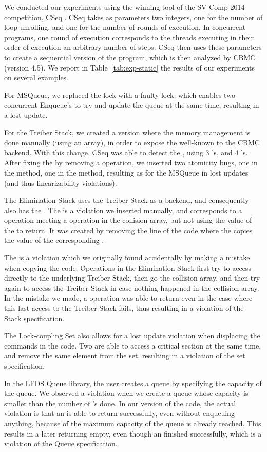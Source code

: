 We conducted our experiments using the winning tool of the SV-Comp 2014 
competition, CSeq \citep{cseq}. CSeq takes as parameters two integers, 
one for the number of loop unrolling, and one for the number of rounds of 
execution. In concurrent programs, one round of execution corresponds to the
threads executing in their order of execution an arbitrary number of steps.
CSeq then uses these parameters to create a sequential version of the program,
which is then analyzed by CBMC (version 4.5). We report in 
Table~\ref{tab:exp-static} the results of our experiments on several examples.

For MSQueue, we replaced the lock with a faulty lock, which enables two 
concurrent Enqueue's to try and update the queue at the same time, resulting
in a lost update.

For the Treiber Stack, we created a version where the memory management is done
manually (using an array), in order to expose the well-known \ababug{} to the 
CBMC backend. With this change, CSeq was able to detect the \ababug{}, using 3 
\Pushm's, and 4 \Popm's. After fixing the \ababug{} by removing a \free{} 
operation, we inserted two atomicity bugs, one in the \Pushm{} method, one in 
the \Popm{} method, resulting as for the MSQueue in lost updates (and thus 
linearizability violations).

The Elimination Stack \citep{elimination stack} uses the Treiber Stack as a 
backend, and consequently also has the \ababug{}. The \emptybug{} is a 
violation we inserted manually, and corresponds to a \Popm{} operation meeting 
a \Pushm{} operation in the collision array, but not using the value of the 
\Pushm{} to return. It was created by removing the line of the code where the 
\Popm{} copies the value of the corresponding \Pushm{}. 

The \bracebug{} is a violation which we originally found accidentally by making 
a mistake when copying the code. Operations in the Elimination Stack first try 
to access directly to the underlying Treiber Stack, then go the collision array, 
and then try again to access the Treiber Stack in case nothing happened in the 
collision array. In the mistake we made, a \Popm{} operation was able to return 
even in the case where this last access to the Treiber Stack fails, thus 
resulting in a violation of the Stack specification.

The Lock-coupling Set also allows for a lost update violation when displacing
the \unlock{} commands in the code. Two \Removem{} are able to access a 
critical section at the same time, and remove the same element from the set,
resulting in a violation of the set specification.
 
In the LFDS Queue library, the user creates a queue by specifying the capacity
of the queue. We observed a violation when we create a queue whose capacity
is smaller than the number of \Enqueuem{}'s done. In our version of the code, 
the actual violation is that an \Enqueuem{} is able to return successfully, 
even without enqueuing anything, because of the maximum capacity of the queue
is already reached. This results in a later \Dequeuem{} returning empty, 
even though an \Enqueuem{} finished successfully, which is a violation of the 
Queue specification.

